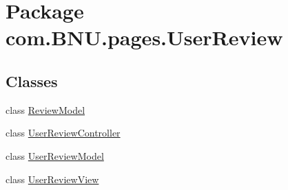 \hypertarget{namespacecom_1_1_b_n_u_1_1pages_1_1_user_review}{}\section{Package com.\+B\+N\+U.\+pages.\+User\+Review}
\label{namespacecom_1_1_b_n_u_1_1pages_1_1_user_review}
\subsection*{Classes}
\begin{DoxyCompactItemize}
\item 
class \mbox{\hyperlink{classcom_1_1_b_n_u_1_1pages_1_1_user_review_1_1_review_model}{Review\+Model}}
\item 
class \mbox{\hyperlink{classcom_1_1_b_n_u_1_1pages_1_1_user_review_1_1_user_review_controller}{User\+Review\+Controller}}
\item 
class \mbox{\hyperlink{classcom_1_1_b_n_u_1_1pages_1_1_user_review_1_1_user_review_model}{User\+Review\+Model}}
\item 
class \mbox{\hyperlink{classcom_1_1_b_n_u_1_1pages_1_1_user_review_1_1_user_review_view}{User\+Review\+View}}
\end{DoxyCompactItemize}
